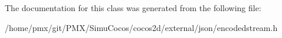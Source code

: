 The documentation for this class was generated from the following file\+:\begin{DoxyCompactItemize}
\item 
/home/pmx/git/\+P\+M\+X/\+Simu\+Cocos/cocos2d/external/json/encodedstream.\+h\end{DoxyCompactItemize}
